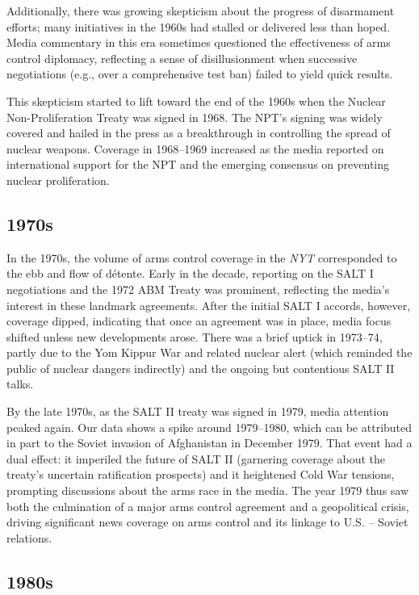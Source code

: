 \documentclass[11,5 pt]{article}
\begin{document}
    Additionally, there was growing skepticism about the progress of disarmament efforts; many initiatives in the 1960s had stalled or delivered less than hoped. Media commentary in this era sometimes questioned the effectiveness of arms control diplomacy, reflecting a sense of disillusionment when successive negotiations (e.g., over a comprehensive test ban) failed to yield quick results. 
    
    This skepticism started to lift toward the end of the 1960s when the Nuclear Non-Proliferation Treaty was signed in 1968. The NPT’s signing was widely covered and hailed in the press as a breakthrough in controlling the spread of nuclear weapons. Coverage in 1968–1969 increased as the media reported on international support for the NPT and the emerging consensus on preventing nuclear proliferation.
    

\subsection*{1970s}

    In the 1970s, the volume of arms control coverage in the \textit{NYT} corresponded to the ebb and flow of détente. Early in the decade, reporting on the SALT I negotiations and the 1972 ABM Treaty was prominent, reflecting the media’s interest in these landmark agreements. After the initial SALT I accords, however, coverage dipped, indicating that once an agreement was in place, media focus shifted unless new developments arose. There was a brief uptick in 1973–74, partly due to the Yom Kippur War and related nuclear alert (which reminded the public of nuclear dangers indirectly) and the ongoing but contentious SALT II talks. 
    
    By the late 1970s, as the SALT II treaty was signed in 1979, media attention peaked again. Our data shows a spike around 1979–1980, which can be attributed in part to the Soviet invasion of Afghanistan in December 1979. That event had a dual effect: it imperiled the future of SALT II (garnering coverage about the treaty’s uncertain ratification prospects) and it heightened Cold War tensions, prompting discussions about the arms race in the media. The year 1979 thus saw both the culmination of a major arms control agreement and a geopolitical crisis, driving significant news coverage on arms control and its linkage to U.S. – Soviet relations.
    
    
\subsection*{1980s}
    
\end{document}
